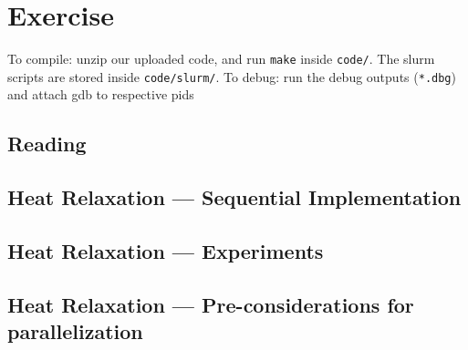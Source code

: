 \documentclass[]{scrartcl}
\newcommand{\exercise}{Exercise \thesection}
\begin{document}
\section*{\exercise}

To compile: unzip our uploaded code, and run \verb|make| inside \verb|code/|.
The slurm scripts are stored inside \verb|code/slurm/|.
To debug: run the debug outputs (\verb|*.dbg|) and attach gdb to respective pids

\subsection{Reading}
\subsection{Heat Relaxation --- Sequential Implementation}
\subsection{Heat Relaxation --- Experiments}
\subsection{Heat Relaxation --- Pre-considerations for parallelization}
\end{document}
